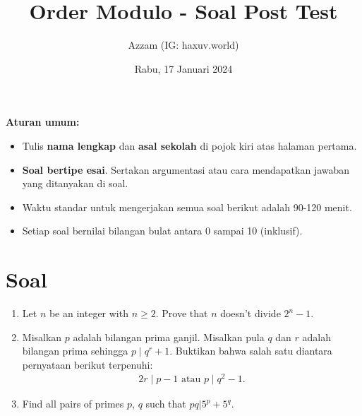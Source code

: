 \documentclass[12pt]{scrartcl}
\title{Order Modulo - Soal Post Test}
\author{Azzam (IG: haxuv.world)}
\date{Rabu, 17 Januari 2024}
\begin{document}
\maketitle

\renewcommand*\contentsname{Daftar Isi}
\tableofcontents

\newpage
\textbf{Aturan umum:}
\begin{itemize}
    \item Tulis \textbf{nama lengkap} dan \textbf{asal sekolah} di pojok kiri atas halaman pertama.
    \item \textbf{Soal bertipe esai}. Sertakan argumentasi atau cara mendapatkan jawaban yang ditanyakan di soal.
    \item Waktu standar untuk mengerjakan semua soal berikut adalah 90-120 menit.
    \item Setiap soal bernilai bilangan bulat antara 0 sampai 10 (inklusif).
\end{itemize}


\section{Soal}
\begin{enumerate}
    \item Let $n$ be an integer with $n \geq 2$. Prove that $n$ doesn’t divide $2^n-1$.
    \item Misalkan $p$ adalah bilangan prima ganjil. Misalkan pula $q$ dan $r$ adalah bilangan prima sehingga $p \mid q^r+1$. Buktikan bahwa salah satu diantara pernyataan berikut terpenuhi: 
    \begin{align*}
        2r \mid p-1 \text{ atau } p \mid q^2-1.
    \end{align*}
    \item Find all pairs of primes $p$, $q$ such that $pq | 5^p + 5^q$.
\end{enumerate}
\end{document}
